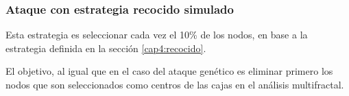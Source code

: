\subsubsection{Ataque con estrategia recocido simulado}

Esta estrategia es seleccionar cada vez el 10\% de los nodos, en base a la estrategia definida en la sección \ref{cap4:recocido}.

El objetivo, al igual que en el caso del ataque genético es eliminar primero los nodos que son seleccionados como centros de las cajas en el análisis multifractal.